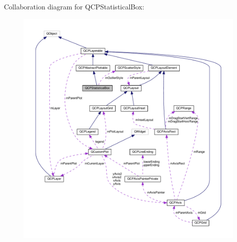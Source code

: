 Collaboration diagram for Q\+C\+P\+Statistical\+Box\+:\nopagebreak
\begin{figure}[H]
\begin{center}
\leavevmode
\includegraphics[width=350pt]{classQCPStatisticalBox__coll__graph}
\end{center}
\end{figure}
